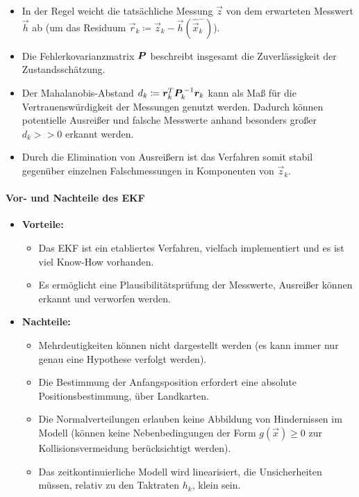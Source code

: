 					\begin{itemize}
						\item In der Regel weicht die tatsächliche Messung \( \vec{z} \) von dem erwarteten Messwert \( \vec{h} \) ab (um das Residuum \( \vec{r}_k \coloneqq \vec{z}_k - \vec{h}(\hat{\vec{x}}_k^-) \)).
						\item Die Fehlerkovarianzmatrix \( \bm{P} \) beschreibt insgesamt die Zuverlässigkeit der Zustandsschätzung.
						\item Der Mahalanobis-Abstand \( d_k \coloneqq \bm{r}_k^T \bm{P}_k^{\,-1} \bm{r}_k \) kann als Maß für die Vertrauenswürdigkeit der Messungen genutzt werden. Dadurch können potentielle Ausreißer und falsche Messwerte anhand besonders großer \( d_k >> 0 \) erkannt werden.
						\item Durch die Elimination von Ausreißern ist das Verfahren somit stabil gegenüber einzelnen Falschmessungen in Komponenten von \( \vec{z}_k \).
					\end{itemize}

				\paragraph{Vor- und Nachteile des EKF}
					\begin{itemize}
						\item \textbf{Vorteile:}
							\begin{itemize}
								\item Das EKF ist ein etabliertes Verfahren, vielfach implementiert und es ist viel Know-How vorhanden.
								\item Es ermöglicht eine Plausibilitätsprüfung der Messwerte, \dh Ausreißer können erkannt und verworfen werden.
							\end{itemize}
						\item \textbf{Nachteile:}
							\begin{itemize}
								\item Mehrdeutigkeiten können nicht dargestellt werden (\dh es kann immer nur genau eine Hypothese verfolgt werden).
								\item Die Bestimmung der Anfangsposition erfordert eine absolute Positionsbestimmung, \zB über Landkarten.
								\item Die Normalverteilungen erlauben keine Abbildung von Hindernissen im Modell (\zB können keine Nebenbedingungen der Form \( g(\vec{x}) \geq 0 \) zur Kollisionsvermeidung berücksichtigt werden).
								\item Das zeitkontinuierliche Modell wird linearisiert, \dh die Unsicherheiten müssen, relativ zu den Taktraten \( h_k \), klein sein.
							\end{itemize}
					\end{itemize}

